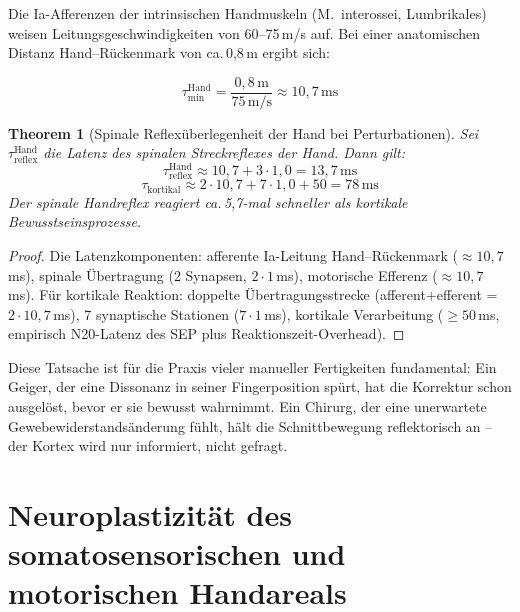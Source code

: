 ﻿\documentclass[12pt,a4paper]{report}
\theoremstyle{plain}
\newtheorem{theorem}{Theorem}[section]
\theoremstyle{definition}
\theoremstyle{remark}
\begin{document}
Die Ia-Afferenzen der intrinsischen Handmuskeln (M.\ interossei, Lumbrikales)
weisen Leitungsgeschwindigkeiten von 60--75\,m/s auf. Bei einer anatomischen
Distanz Hand--Rückenmark von ca.\,0{,}8\,m ergibt sich:

\[
  \tau_{\min}^{\text{Hand}} = \frac{0{,}8\,\text{m}}{75\,\text{m/s}}
  \approx 10{,}7\,\text{ms}
\]

\begin{theorem}[Spinale Reflexüberlegenheit der Hand bei Perturbationen]
\label{thm:reflex}
Sei $\tau_{\text{reflex}}^{\text{Hand}}$ die Latenz des spinalen
Streckreflexes der Hand. Dann gilt:
\[
  \tau_{\text{reflex}}^{\text{Hand}} \approx 10{,}7 + 3 \cdot 1{,}0 = 13{,}7\,\text{ms}
\]
\[
  \tau_{\text{kortikal}} \approx 2 \cdot 10{,}7 + 7 \cdot 1{,}0 + 50 = 78\,\text{ms}
\]
Der spinale Handreflex reagiert ca.\,5{,}7-mal schneller als kortikale
Bewusstseinsprozesse.
\end{theorem}

\begin{proof}
Die Latenzkomponenten: afferente Ia-Leitung Hand--Rückenmark ($\approx 10{,}7$\,ms),
spinale Übertragung (2 Synapsen, $2 \cdot 1$\,ms), motorische Efferenz
($\approx 10{,}7$\,ms). Für kortikale Reaktion: doppelte Übertragungsstrecke
(afferent+efferent = $2 \cdot 10{,}7$\,ms), 7 synaptische Stationen
($7 \cdot 1$\,ms), kortikale Verarbeitung ($\geq 50$\,ms, empirisch N20-Latenz
des SEP plus Reaktionszeit-Overhead).
\end{proof}

Diese Tatsache ist für die Praxis vieler manueller Fertigkeiten fundamental:
Ein Geiger, der eine Dissonanz in seiner Fingerposition spürt, hat die
Korrektur schon ausgelöst, bevor er sie bewusst wahrnimmt. Ein Chirurg,
der eine unerwartete Gewebewiderstandsänderung fühlt, hält die Schnittbewegung
reflektorisch an -- der Kortex wird nur informiert, nicht gefragt.

\chapter{Neuroplastizität des somatosensorischen und motorischen Handareals}
\label{chap:plastizitaet}
\end{document}
